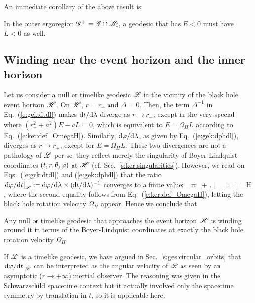 An immediate corollary of the above result is:
\begin{greybox}
In the outer ergoregion
$\mathscr{G}^+ = \mathscr{G}\cap \mathscr{M}_{\rm I}$, a geodesic that has $E < 0$
must have $L<0$ as well.
\end{greybox}


\subsection{Winding near the event horizon and the inner horizon}

Let us consider a null or timelike geodesic $\mathscr{L}$ in the vicinity of the
black hole event horizon $\mathscr{H}$.
On $\mathscr{H}$, $r=r_+$ and $\Delta = 0$. Then, the term
$\Delta^{-1}$ in Eq.~(\ref{e:gek:dtdl}) makes $\mathrm{d} t/\mathrm{d}\lambda$ diverge as
$r\to r_+$, except in the very special where $(r_+^2 + a^2)E - aL = 0$, which
is equivalent to $E = \Omega_H L$ according to Eq.~(\ref{e:ker:def_OmegaH}).
Similarly, $\mathrm{d}\varphi/\mathrm{d}\lambda$, as given by Eq.~(\ref{e:gek:dphdl}), diverges
as $r\to r_+$, except for $E = \Omega_H L$. These two divergences are not
a pathology of $\mathscr{L}$ per se; they
reflect merely the singularity of Boyer-Lindquist coordinates $(t,r,\theta,\varphi)$ at $\mathscr{H}$
(cf.  Sec.~\ref{s:ker:singularities}). However, we read on Eqs.~(\ref{e:gek:dtdl}) and
(\ref{e:gek:dphdl}) that the ratio
$\left. \mathrm{d}\varphi/\mathrm{d} t \right| _{\mathscr{L}} := \mathrm{d}\varphi/\mathrm{d}\lambda \times (\mathrm{d} t/\mathrm{d}\lambda)^{-1}$
converges to a finite value:
\be \label{e:gek:lim_dphdt_Hor}
    \lim_{r\to r_+} \left.  \right| _{\Li} =  = \Omega_H ,
\ee
where the second equality follows from Eq.~(\ref{e:ker:def_OmegaH}), letting
the black hole rotation velocity $\Omega_H$ appear.
Hence we conclude that
\begin{greybox}
Any null or timelike geodesic that approaches the event horizon $\mathscr{H}$
is winding around it in terms of the Boyer-Lindquist coordinates at exactly the black hole rotation velocity $\Omega_H$.
\end{greybox}
If $\mathscr{L}$ is a timelike geodesic, we have argued in Sec.~\ref{s:ges:circular_orbits}
that $\left. \mathrm{d}\varphi/\mathrm{d} t \right| _{\mathscr{L}}$ can be interpreted as the angular velocity of
$\mathscr{L}$ as seen by an asymptotic ($r\to +\infty$) inertial observer. The reasoning was
given in the Schwarzschild spacetime context but it actually  involved only
the spacetime symmetry by translation in $t$, so it is applicable here.


